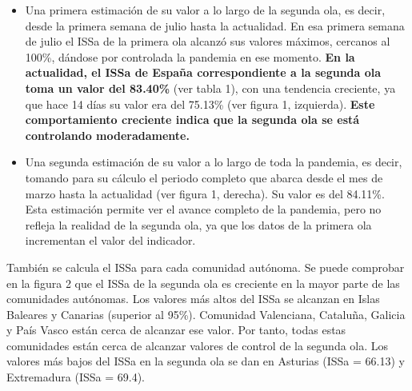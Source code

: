 \documentclass[
  11pt,
]{article}
\begin{document}
\begin{itemize}
\item
  Una primera estimación de su valor a lo largo de la segunda ola, es
  decir, desde la primera semana de julio hasta la actualidad. En esa
  primera semana de julio el ISSa de la primera ola alcanzó sus valores
  máximos, cercanos al 100\%, dándose por controlada la pandemia en ese
  momento. \textbf{En la actualidad, el ISSa de España correspondiente a
  la segunda ola toma un valor del 83.40\%} (ver tabla 1), con una
  tendencia creciente, ya que hace 14 días su valor era del 75.13\% (ver
  figura 1, izquierda). \textbf{Este comportamiento creciente indica que
  la segunda ola se está controlando moderadamente.}
\item
  Una segunda estimación de su valor a lo largo de toda la pandemia, es
  decir, tomando para su cálculo el periodo completo que abarca desde el
  mes de marzo hasta la actualidad (ver figura 1, derecha). Su valor es
  del 84.11\%. Esta estimación permite ver el avance completo de la
  pandemia, pero no refleja la realidad de la segunda ola, ya que los
  datos de la primera ola incrementan el valor del indicador.
\end{itemize}

También se calcula el ISSa para cada comunidad autónoma. Se puede
comprobar en la figura 2 que el ISSa de la segunda ola es creciente en
la mayor parte de las comunidades autónomas. Los valores más altos del
ISSa se alcanzan en Islas Baleares y Canarias (superior al 95\%).
Comunidad Valenciana, Cataluña, Galicia y País Vasco están cerca de
alcanzar ese valor. Por tanto, todas estas comunidades están cerca de
alcanzar valores de control de la segunda ola. Los valores más bajos del
ISSa en la segunda ola se dan en Asturias (ISSa = 66.13) y Extremadura
(ISSa = 69.4).
\end{document}
